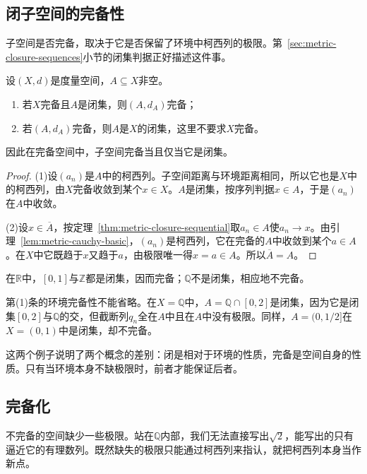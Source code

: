 \subsection{闭子空间的完备性}
\label{sec:metric-closed-complete}

子空间是否完备，取决于它是否保留了环境中柯西列的极限。第~\ref{sec:metric-closure-sequences}小节的闭集判据正好描述这件事。

\begin{theorem}[闭子空间与完备子空间]
\label{thm:metric-closed-complete}
设$(X,d)$是度量空间，$A\subseteq X$非空。
\begin{enumerate}
\item 若$X$完备且$A$是闭集，则$(A,d_A)$完备；
\item 若$(A,d_A)$完备，则$A$是$X$的闭集，这里不要求$X$完备。
\end{enumerate}
因此在完备空间中，子空间完备当且仅当它是闭集。
\end{theorem}

\begin{proof}
(1)设$(a_n)$是$A$中的柯西列。子空间距离与环境距离相同，所以它也是$X$中的柯西列，由$X$完备收敛到某个$x\in X$。$A$是闭集，按序列判据$x\in A$，于是$(a_n)$在$A$中收敛。

(2)设$x\in\overline A$，按定理~\ref{thm:metric-closure-sequential}取$a_n\in A$使$a_n\to x$。由引理~\ref{lem:metric-cauchy-basic}，$(a_n)$是柯西列，它在完备的$A$中收敛到某个$a\in A$。在$X$中它既趋于$x$又趋于$a$，由极限唯一得$x=a\in A$。所以$\overline A=A$。
\end{proof}

在$\mathbb R$中，$[0,1]$与$\mathbb Z$都是闭集，因而完备；$\mathbb Q$不是闭集，相应地不完备。

第(1)条的环境完备性不能省略。在$X=\mathbb Q$中，$A=\mathbb Q\cap[0,2]$是闭集，因为它是闭集$[0,2]$与$\mathbb Q$的交，但截断列$q_n$全在$A$中且在$A$中没有极限。同样，$A=(0,1/2]$在$X=(0,1)$中是闭集，却不完备。

这两个例子说明了两个概念的差别：闭是相对于环境的性质，完备是空间自身的性质。只有当环境本身不缺极限时，前者才能保证后者。

\subsection{完备化}
\label{sec:metric-completion}

不完备的空间缺少一些极限。站在$\mathbb Q$内部，我们无法直接写出$\sqrt2$，能写出的只有逼近它的有理数列。既然缺失的极限只能通过柯西列来指认，就把柯西列本身当作新点。

